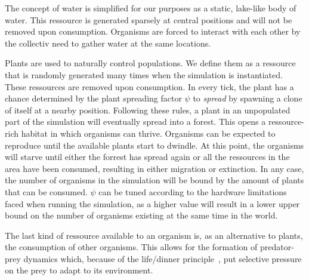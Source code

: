 The concept of water is simplified for our purposes as a static, lake-like body of water.
This ressource is generated sparsely at central positions and will not be removed upon consumption.
Organisms are forced to interact with each other by the collectiv need to gather water at the same locations.

Plants are used to naturally control populations. We define them as a ressource that is randomly generated
many times when the simulation is instantiated. These ressources are removed upon consumption. In every tick, 
the plant has a chance determined by the plant spreading factor \(\psi \) to \emph{spread} by spawning a clone of itself
at a nearby position. Following these rules, a plant in an unpopulated part of the simulation will eventually spread 
into a forest.
This opens a ressource-rich habitat in which organisms can thrive. Organisms can be expected to 
reproduce until the available plants start to dwindle. At this point, the organisms will starve until either 
the forrest has spread again or all the ressources in the area have been consumed, resulting in either
migration or extinction. In any case, the number of organisms in the simulation will be bound by the amount of 
plants that can be consumed. 
\(\psi \) can be tuned according to the hardware limitations faced when running the simulation, as a higher value
will result in a lower upper bound on the number of organisms existing at the same time in the world.

The last kind of ressource available to an organism is, as an alternative to plants, the consumption of 
other organisms. This allows for the formation of predator-prey dynamics which, 
because of the life/dinner principle~\cite{Dawkins1982}, put selective pressure on the prey to adapt to its 
environment.
